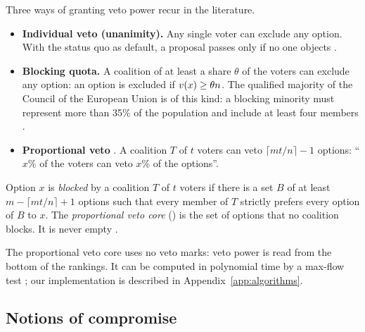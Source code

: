 Three ways of granting veto power recur in the literature.
\begin{itemize}
  \item \textbf{Individual veto (unanimity).} Any single voter can exclude any option. With the status
  quo as default, a proposal passes only if no one objects \citep{BuchananTullock1962,Tsebelis2002}.
  \item \textbf{Blocking quota.} A coalition of at least a share $\theta$ of the voters can exclude any
  option: an option is excluded if $v(x) \ge \theta n$. The qualified majority of the Council of the
  European Union is of this kind: a blocking minority must represent more than 35\% of the population
  and include at least four members \citep{TEU2016art16}.
  \item \textbf{Proportional veto} \citep{Moulin1981,Moulin1982}. A coalition $T$ of $t$ voters can
  veto $\lceil m t / n \rceil - 1$ options: ``$x$\% of the voters can veto $x$\% of the options''.
\end{itemize}

\begin{definition}\label{def:pvc}
Option $x$ is \emph{blocked} by a coalition $T$ of $t$ voters if there is a set $B$ of at least
$m - \lceil m t/n \rceil + 1$ options such that every member of $T$ strictly prefers every option of $B$
to $x$. The \emph{proportional veto core} (\PVC) is the set of options that no coalition blocks. It is
never empty \citep{Moulin1981}.
\end{definition}

The proportional veto core uses no veto marks: veto power is read from the bottom of the rankings. It
can be computed in polynomial time by a max-flow test \citep{IanovskiKondratev2021}; our implementation
is described in Appendix~\ref{app:algorithms}.

\subsection{Notions of compromise}


